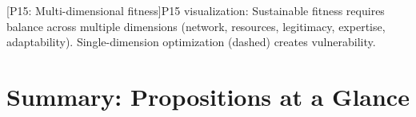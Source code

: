 \documentclass[../main.tex]{subfiles}
\begin{document}
\begin{center}
[P15: Multi-dimensional fitness]{P15 visualization: Sustainable fitness requires balance across multiple dimensions (network, resources, legitimacy, expertise, adaptability). Single-dimension optimization (dashed) creates vulnerability.}
\end{center}


\section{Summary: Propositions at a Glance}
\end{document}
